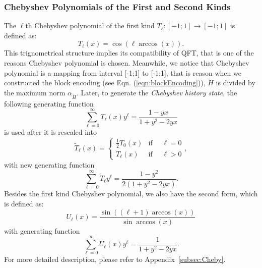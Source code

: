 \subsubsection{Chebyshev Polynomials of the First and Second Kinds}
The $\ell$th Chebyshev polynomial of the first kind $T_{\ell}:[-1;1]\rightarrow[-1;1]$ is defined as:
\begin{equation}
    T_{\ell}(x)=\cos(\ell \arccos(x)).
    \label{eqn:FirstCheby}
\end{equation}
This trignometrical structure implies its compatibility of QFT, that is one of the reasons Chebyshev polynomial is chosen. Meanwhile, we notice that Chebyshev polynomial is a mapping from interval [-1;1] to [-1;1], that is reason when we constructed the block encoding (see Eqn. (\ref{eqn:blockEncoding})), $\tilde{H}$ is divided by the maximum norm $\alpha_{\tilde{H}}$. Later, to generate the \textit{Chebyshev history state}, the following generating function
\begin{equation}
    \sum_{\ell=0}^{\infty}T_{\ell}(x)y^{\ell}=\frac{1-yx}{1+y^2-2yx}
    \label{eqn:FirstGeneratingFunction}
\end{equation}
is used \cite{inproceedings} after it is rescaled into
\begin{equation}
    \tilde{T}_{\ell}(x)= 
    \begin{cases}
        \frac{1}{2}T_0(x) & \text{if } \quad \ell=0 \\
        T_{\ell}(x) & \text{if } \quad \ell > 0
    \end{cases},
\end{equation}
with new generating function
\begin{equation}
    \sum_{\ell=0}^\infty\tilde{T}_{\ell}y^{\ell}=\frac{1-y^2}{2(1+y^2-2yx)}.
    \label{eqn:GenerationScaledCheby}
\end{equation}
Besides the first kind Chebyshev polynomial, we also have the second form, which is defined as:
\begin{equation}
    U_{\ell}(x)=\frac{\sin((\ell+1)\arccos(x))}{\sin{\arccos(x)}}
\end{equation}
with generating function
\begin{equation}
    \sum_{\ell=0}^{\infty}U_{\ell}(x)y^{\ell}=\frac{1}{1+y^2-2yx}.
\end{equation}
For more detailed description, please refer to Appendix~\ref{subsec:Cheby}.

